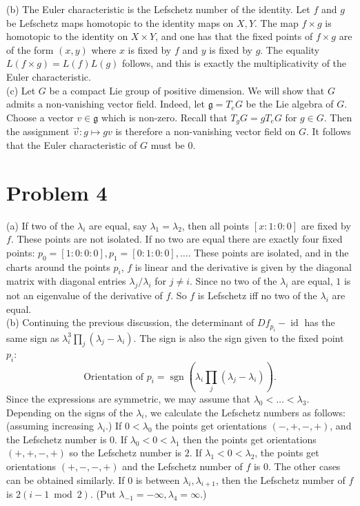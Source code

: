 \documentclass{amsart}
\numberwithin{equation}{section}
\theoremstyle{plain}
\theoremstyle{definition}
\theoremstyle{remark}
\newcommand{\g}{\mathfrak{g}}
\renewcommand{\_}[2]{\underbrace{#1}_{#2}}
\renewcommand{\^}[2]{\overbrace{#1}_{#2}}
\newcommand{\sgn}{\operatorname{sgn}}
\newcommand{\id}{\operatorname{id}}
\begin{document}
(b) The Euler characteristic is the Lefschetz number of the identity. Let $f$ and $g$ be Lefschetz maps homotopic to the identity maps on $X,Y$. The map $f\times g$ is homotopic to the identity on $X\times Y$, and one has that the fixed points of $f\times g$ are of the form $(x,y)$ where $x$ is fixed by $f$ and $y$ is fixed by $g$. The equality $L(f\times g) = L(f)L(g)$ follows, and this is exactly the multiplicativity of the Euler characteristic.\\

(c) Let $G$ be a compact Lie group of positive dimension. We will show that $G$ admits a non-vanishing vector field. Indeed, let $\g = T_eG$ be the Lie algebra of $G$. Choose a vector $v \in \g$ which is non-zero. Recall that $T_gG = gT_eG$ for $g\in G$. Then the assignment $\vec v: g \mapsto gv$ is therefore a non-vanishing vector field on $G$. It follows that the Euler characteristic of $G$ must be $0$.

\section*{Problem 4}

(a) If two of the $\lambda_i$ are equal, say $\lambda_1 = \lambda_2$, then all points $[x:1:0:0]$ are fixed by $f$. These points are not isolated. If no two are equal there are exactly four fixed points: $p_0 = [1:0:0:0], p_1 = [0:1:0:0], \dots$. These points are isolated, and in the charts around the points $p_i$, $f$ is linear and the derivative is given by the diagonal matrix with diagonal entries $\lambda_j/\lambda_i$ for $j\neq i$. Since no two of the $\lambda_i$ are equal, $1$ is not an eigenvalue of the derivative of $f$. So $f$ is Lefschetz iff no two of the $\lambda_i$ are equal.\\

(b) Continuing the previous discussion, the determinant of $Df_{p_i} - \id$ has the same sign as $\lambda_i^3\prod_j (\lambda_j - \lambda_i)$. The sign is also the sign given to the fixed point $p_i$: \[\text{Orientation of $p_i$} = \sgn\left (\lambda_i\prod_j (\lambda_j - \lambda_i)\right).\] Since the expressions are symmetric, we may assume that $\lambda_0 < \dots < \lambda_3$. Depending on the signs of the $\lambda_i$, we calculate the Lefschetz numbers as follows: (assuming increasing $\lambda_i$.) If $0<\lambda_0$ the points get orientations $(-,+,-,+)$, and the Lefschetz number is $0$. If $\lambda_0 < 0 < \lambda_1$ then the points get orientations $(+, +, - , +)$ so the Lefschetz number is $2$. If $\lambda_1 < 0 <\lambda_2$, the points get orientations $(+,-,-,+)$ and the Lefschetz number of $f$ is $0$. The other cases can be obtained similarly. If $0$ is between $\lambda_i, \lambda_{i+1}$, then the Lefschetz number of $f$ is $2 (i-1\bmod 2)$. (Put $\lambda_{-1} = -\infty, \lambda_4 = \infty$.)\\
\end{document}

